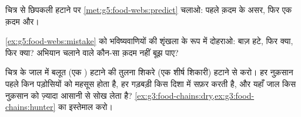 \begin{exercise}[$\star\star$]\label{exo:g5:food-webs:9}
चित्र से छिपकली हटाने पर \cref{met:g5:food-webs:predict} चलाओ: पहले
क़दम के असर, फिर एक क़दम और।
\end{exercise}

\begin{exercise}[$\star\star$]\label{exo:g5:food-webs:10}
\cref{ex:g5:food-webs:mistake} को भविष्यवाणियों की शृंखला के रूप में
दोहराओ: बाज़ हटे, फिर क्या, फिर क्या? अभियान चलाने वाले कौन-सा क़दम नहीं
बूझ पाए?
\end{exercise}

\begin{exercise}[$\star\star\star$]\label{exo:g5:food-webs:11}
चित्र के जाल में बलूत (एक ) हटाने की तुलना शिकरे (एक शीर्ष
शिकारी) हटाने से करो। हर नुक़सान पहले किन पड़ोसियों को महसूस होता है,
हर गड़बड़ी किस दिशा में सफ़र करती है, और यहाँ जाल किस नुक़सान को ज़्यादा
आसानी से सोख लेता है?
\cref{ex:g3:food-chains:dry,ex:g3:food-chains:hunter} का इस्तेमाल करो।
\end{exercise}
